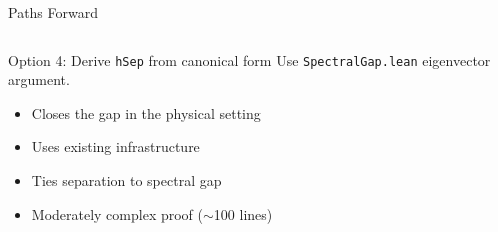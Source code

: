 \documentclass[aspectratio=169,10pt]{beamer}
\begin{document}
\begin{frame}{Paths Forward}
\begin{columns}[T]
\begin{block}{\small Option 4: Derive \texttt{hSep} from canonical form}
Use \texttt{SpectralGap.lean} eigenvector argument.
\begin{itemize}
  \item[\textcolor{leangreen}{+}] Closes the gap in the physical setting
  \item[\textcolor{leangreen}{+}] Uses existing infrastructure
  \item[\textcolor{softred}{--}] Ties separation to spectral gap
  \item[\textcolor{softred}{--}] Moderately complex proof ($\sim$100 lines)
\end{itemize}
\end{block}
\end{columns}
\end{frame}
\end{document}
